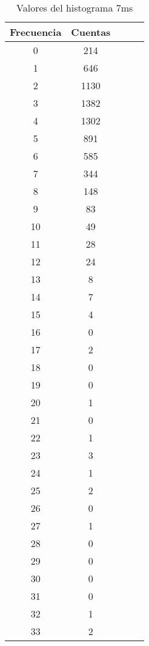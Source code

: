 \begin{center}
\begin{table}[H]
\caption{Valores del histograma 7ms}
\label{Tab:histo_7s}
\begin{tabular}{ccccc}
\toprule
Frecuencia & Cuentas \\
\midrule
\num{    0} & \num{  214} \\
\num{    1} & \num{  646} \\
\num{    2} & \num{ 1130} \\
\num{    3} & \num{ 1382} \\
\num{    4} & \num{ 1302} \\
\num{    5} & \num{  891} \\
\num{    6} & \num{  585} \\
\num{    7} & \num{  344} \\
\num{    8} & \num{  148} \\
\num{    9} & \num{   83} \\
\num{   10} & \num{   49} \\
\num{   11} & \num{   28} \\
\num{   12} & \num{   24} \\
\num{   13} & \num{    8} \\
\num{   14} & \num{    7} \\
\num{   15} & \num{    4} \\
\num{   16} & \num{    0} \\
\num{   17} & \num{    2} \\
\num{   18} & \num{    0} \\
\num{   19} & \num{    0} \\
\num{   20} & \num{    1} \\
\num{   21} & \num{    0} \\
\num{   22} & \num{    1} \\
\num{   23} & \num{    3} \\
\num{   24} & \num{    1} \\
\num{   25} & \num{    2} \\
\num{   26} & \num{    0} \\
\num{   27} & \num{    1} \\
\num{   28} & \num{    0} \\
\num{   29} & \num{    0} \\
\num{   30} & \num{    0} \\
\num{   31} & \num{    0} \\
\num{   32} & \num{    1} \\
\num{   33} & \num{    2} \\

\end{tabular}
\end{table}
\end{center}
